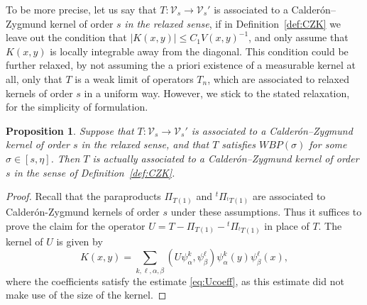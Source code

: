 \documentclass{amsart}
\numberwithin{equation}{section}
\theoremstyle{plain}
\newtheorem{proposition}[equation]{Proposition}
\theoremstyle{definition}
\theoremstyle{remark}
\begin{document}
{{{To be more precise, let us say that $T:\mathcal{V}_s\to\mathcal{V}_s'$ is associated to a Calder\'on--Zygmund kernel of order $s$ \emph{in the relaxed sense}, if in Definition~\ref{def:CZK} we leave out the condition that ${|{K(x,y)}|}\leq C_1 V(x,y)^{-1}$, and only assume that $K(x,y)$ is locally integrable away from the diagonal. This condition could be further relaxed, by not assuming the a priori existence of a measurable kernel at all, only that $T$ is a weak limit of operators $T_n$, which are associated to relaxed kernels of order $s$ in a uniform way. However, we stick to the stated relaxation, for the simplicity of formulation.

\begin{proposition}
Suppose that $T:\mathcal{V}_s\to\mathcal{V}_s'$ is associated to a Calder\'on--Zygmund kernel of order $s$ in the relaxed sense, and that $T$ satisfies $WBP(\sigma)$ for some $\sigma\in[s,\eta]$. Then $T$ is actually associated to a Calder\'on--Zygmund kernel of order $s$ in the sense of Definition~\ref{def:CZK}.
\end{proposition}

\begin{proof}
Recall that the paraproducts $\Pi_{T(1)}$ and ${}^t\Pi_{{}^tT(1)}$ are associated to Calder\'on-Zygmund kernels of order $s$ under these assumptions. Thus it suffices to prove the claim for the operator $U=T-\Pi_{T(1)}-{}^t\Pi_{{}^tT(1)}$ in place of $T$. The kernel of $U$ is given by
\begin{equation*}
  K(x,y)=\sum_{k,\ell,\alpha,\beta}(U\psi^k_\alpha,\psi^\ell_\beta)\psi^k_\alpha(y)\psi^\ell_\beta(x),
\end{equation*}
where the coefficients satisfy the estimate \eqref{eq:Ucoeff}, as this estimate did not make use of the size of the kernel.


\end{proof}}}}
\end{document}
